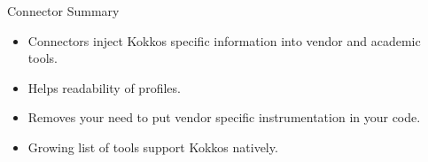 \begin{frame}[fragile]{Connector Summary}
  \begin{itemize}
    \item Connectors inject Kokkos specific information into vendor and academic tools.
    \item Helps readability of profiles.
    \item Removes your need to put vendor specific instrumentation in your code.
    \item Growing list of tools support Kokkos natively.
  \end{itemize}
\end{frame}

